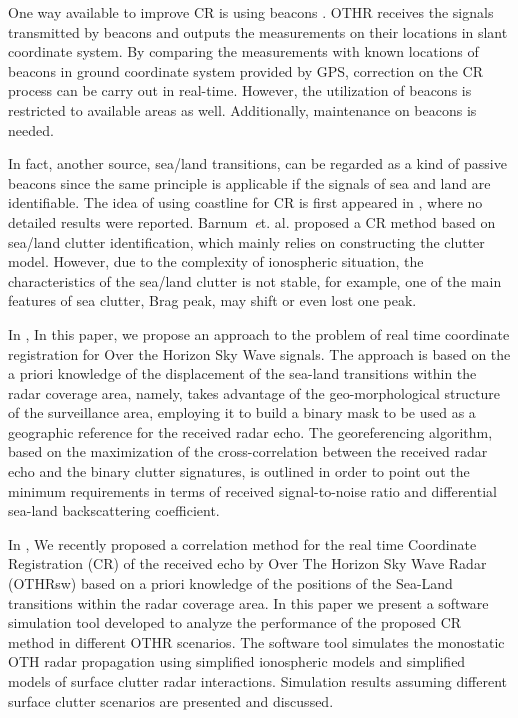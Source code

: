 One way available to improve CR is using beacons \cite{weijers1995oth}. OTHR receives the signals transmitted by beacons and outputs the measurements on their locations in slant coordinate system. By comparing the measurements with known locations of beacons in ground coordinate system provided by GPS, correction on the CR process can be carry out in real-time. However, the utilization of beacons is restricted to available areas as well. Additionally, maintenance on beacons is needed.

In fact, another source, sea/land transitions, can be regarded as a kind of passive beacons since the same principle is applicable if the signals of sea and land are identifiable. The idea of using coastline for CR is first appeared in \cite{wheadon1994ionospheric, anderson1995auto}, where no detailed results were reported. Barnum~{\emph et. al.} \cite{barnum1998over} proposed a CR method based on sea/land clutter identification, which mainly relies on constructing the clutter model. However, due to the complexity of ionospheric situation, the characteristics of the sea/land clutter is not stable, for example, one of the main features of sea clutter, Brag peak, may shift or even lost one peak.


In \cite{cuccoli2009over, cuccoli2009over2, cuccoli2010sea, cuccoli2011coordinate}, In this paper, we propose an approach to the problem of real time coordinate registration for Over the Horizon Sky Wave signals. The approach is based on the a priori knowledge of the displacement of the sea-land transitions within the radar coverage area, namely, takes advantage of the geo-morphological structure of the surveillance area, employing it to build a binary mask to be used as a geographic reference for the received radar echo. The georeferencing algorithm, based on the maximization of the cross-correlation between the received radar echo and the binary clutter signatures, is outlined in order to point out the minimum requirements in terms of received signal-to-noise ratio and differential sea-land backscattering coefficient.

In \cite{cuccoli2009over2}, We recently proposed a correlation method for the real time Coordinate Registration (CR) of the received echo by Over The Horizon Sky Wave Radar (OTHRsw) based on a priori knowledge of the positions of the Sea-Land transitions within the radar coverage area. In this paper we present a software simulation tool developed to analyze the performance of the proposed CR method in different OTHR scenarios. The software tool simulates the monostatic OTH radar propagation using simplified ionospheric models and simplified models of surface clutter radar interactions. Simulation results assuming different surface clutter scenarios are presented and discussed.

